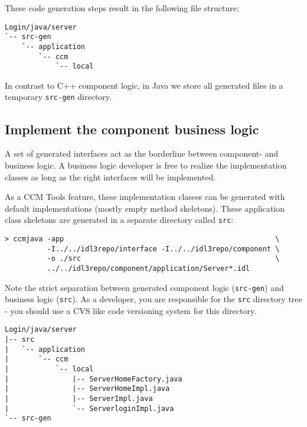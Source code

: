 These code generation steps result in the following file structure:
\begin{footnotesize}
\begin{verbatim}
Login/java/server
`-- src-gen
    `-- application
        `-- ccm
            `-- local
\end{verbatim}
\end{footnotesize}

In contrast to C++ component logic, in Java we store all generated files in a
temporary {\tt src-gen} directory.


\subsection{Implement the component business logic}
\label{subsection:ImplementBusinessLogicInJava}
A set of generated interfaces act as the borderline between component-
and business logic. A business logic developer is free to realize the
implementation classes as long as the right interfaces will be implemented. 

\vspace{3mm}
As a CCM Tools feature, these implementation classes can be generated with
default implementations (mostly empty method skeletons).
These application class skeletons are generated in a separate directory called
{\tt src}: 
\begin{footnotesize}
\begin{verbatim}
> ccmjava -app                                                  \
          -I../../idl3repo/interface -I../../idl3repo/component \
          -o ./src                                              \
          ../../idl3repo/component/application/Server*.idl      
\end{verbatim}
\end{footnotesize}
Note the strict separation between generated component logic ({\tt src-gen})
and business logic ({\tt src}). 
As a developer, you are responsible for the {\tt src} directory tree - you
should use a CVS like code versioning system for this directory.
\begin{footnotesize}
\begin{verbatim}
Login/java/server
|-- src
|   `-- application
|       `-- ccm
|           `-- local
|               |-- ServerHomeFactory.java
|               |-- ServerHomeImpl.java
|               |-- ServerImpl.java
|               `-- ServerloginImpl.java
`-- src-gen
\end{verbatim}
\end{footnotesize}

